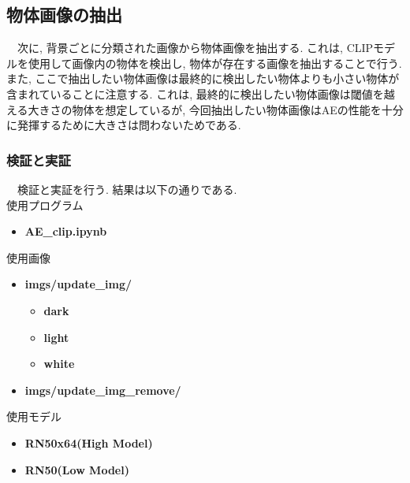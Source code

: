 \documentclass[a4paper, 12pt]{report}
\begin{document}
\subsection{物体画像の抽出}
　次に, 背景ごとに分類された画像から物体画像を抽出する. これは, CLIPモデルを使用して画像内の物体を検出し, 物体が存在する画像を抽出することで行う. 
また, ここで抽出したい物体画像は最終的に検出したい物体よりも小さい物体が含まれていることに注意する. 
これは, 最終的に検出したい物体画像は閾値を越える大きさの物体を想定しているが, 今回抽出したい物体画像はAEの性能を十分に発揮するために大きさは問わないためである.\\ 

\subsubsection{検証と実証}
　検証と実証を行う. 結果は以下の通りである. \\

使用プログラム
\begin{itemize}
    \item \textbf{AE\_clip.ipynb}
\end{itemize}

使用画像
\begin{itemize}
    \item \textbf{imgs/update\_img/}
    \begin{itemize}
        \item \textbf{dark}
        \item \textbf{light}
        \item \textbf{white}
    \end{itemize}
    \item \textbf{imgs/update\_img\_remove/}
\end{itemize}

使用モデル
\begin{itemize}
    \item \textbf{RN50x64(High Model)}
    \item \textbf{RN50(Low Model)}
\end{itemize}
\end{document}
